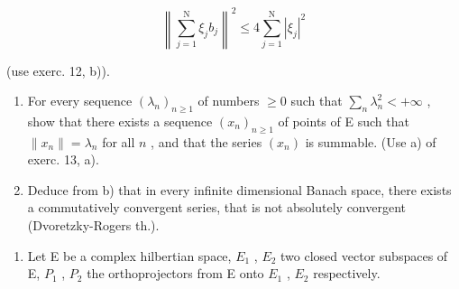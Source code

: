 \[
\left\| \sum_ {j = 1} ^ {\mathrm{N}} \xi_ {j} b _ {j} \right\| ^ {2} \leqslant 4 \sum_ {j = 1} ^ {\mathrm{N}} | \xi_ {j} | ^ {2}
\]

(use exerc. 12, b)).

\begin{enumerate}
\def\labelenumi{\alph{enumi})}
\setcounter{enumi}{1}
\item
  For every sequence \((\lambda_n)_{n\geqslant 1}\) of numbers \(\geqslant 0\) such that \(\sum_{n}\lambda_{n}^{2} < +\infty\) , show that there exists a sequence \((x_{n})_{n\geqslant 1}\) of points of E such that \(\| x_n\| = \lambda_n\) for all \(n\) , and that the series \((x_{n})\) is summable. (Use a) of exerc. 13, a).
\item
  Deduce from b) that in every infinite dimensional Banach space, there exists a commutatively convergent series, that is not absolutely convergent (Dvoretzky-Rogers th.).
\end{enumerate}

\begin{enumerate}
\def\labelenumi{\arabic{enumi})}
\setcounter{enumi}{14}
\tightlist
\item
  Let E be a complex hilbertian space, \(E_{1}\) , \(E_{2}\) two closed vector subspaces of E, \(P_{1}\) , \(P_{2}\) the orthoprojectors from E onto \(E_{1}\) , \(E_{2}\) respectively.
\end{enumerate}

